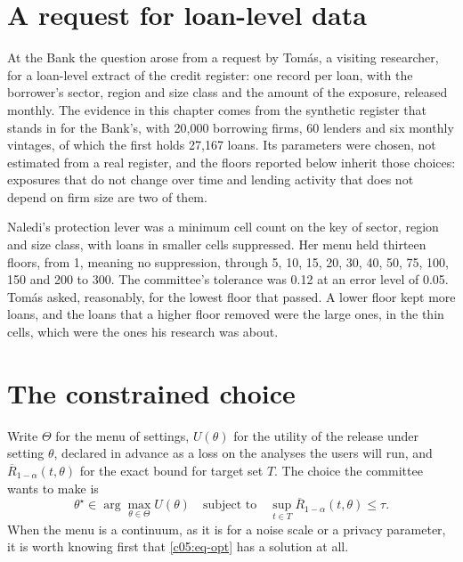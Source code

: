 \section{A request for loan-level data}

At the Bank the question arose from a request by Tomás, a visiting researcher, for a
loan-level extract of the credit register: one record per loan, with the borrower's
sector, region and size class and the amount of the exposure, released monthly. The
evidence in this chapter comes from the synthetic register that stands in for the Bank's,
with 20,000 borrowing firms, 60 lenders and six monthly vintages, of which the first
holds 27,167 loans.
Its parameters were chosen, not estimated from a real register, and the floors reported
below inherit those choices: exposures that do not change over time and lending activity
that does not depend on firm size are two of them.

Naledi's protection lever was a minimum cell count on the key of sector, region and size
class, with loans in smaller cells suppressed. Her menu held thirteen floors, from 1,
meaning no suppression, through 5, 10, 15, 20, 30, 40, 50, 75, 100, 150 and 200 to 300.
The committee's tolerance was 0.12 at an error level of 0.05.
Tomás asked, reasonably, for the lowest floor that passed. A lower floor kept more loans,
and the loans that a higher floor removed were the large ones, in the thin cells, which
were the ones his research was about.

\section{The constrained choice}

Write $\Theta$ for the menu of settings, $U(\theta)$ for the utility of the release under
setting $\theta$, declared in advance as a loss on the analyses the users will run, and
$\overline{R}_{1-\alpha}(t,\theta)$ for the exact bound for target set $T$. The choice
the committee wants to make is
\begin{equation}\label{c05:eq-opt}
\theta^\star \in \arg\max_{\theta \in \Theta} U(\theta)
\quad \text{subject to} \quad
\sup_{t \in T}\overline{R}_{1-\alpha}(t,\theta) \le \tau .
\end{equation}
When the menu is a continuum, as it is for a noise scale or a privacy parameter, it is
worth knowing first that \eqref{c05:eq-opt} has a solution at all.

